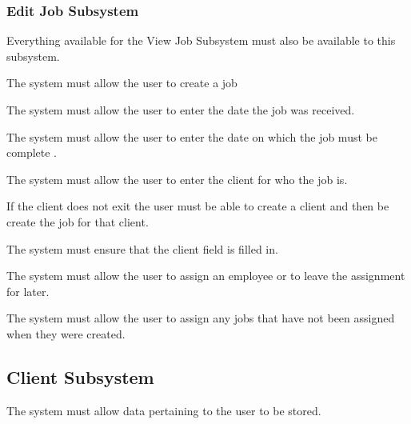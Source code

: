 \documentclass{article}
\begin{document}
	
	\subsubsection*{Edit Job Subsystem}	
	\begin{list}{R.}{}
		\item Everything available for the View Job Subsystem must also be available to this subsystem.
		\item The system must allow the user to create a job
		\begin{list}{R.}{}
			\item The system must allow the user to enter the date the job was received.
			\item The system must allow the user to enter the date on which the job must be complete .
			\item The system must allow the user to enter the client for who the job is.
			\begin{list}{R..}{}
				\item If the client does not exit the user must be able to create a client and then be create the job for that client.
				\item The system must ensure that the client field is filled in.
			\end{list}
			\item The system must allow the user to assign an employee or to leave the assignment for later.
		\end{list}
		\item The system must allow the user to assign any jobs that have not been assigned when they were created.
		
	\end{list}
	
	
	
	\subsection*{Client Subsystem}	
	\begin{list}{R.}{}
		\item The system must allow data pertaining to the user to be stored.
	\end{list}
\end{document}
